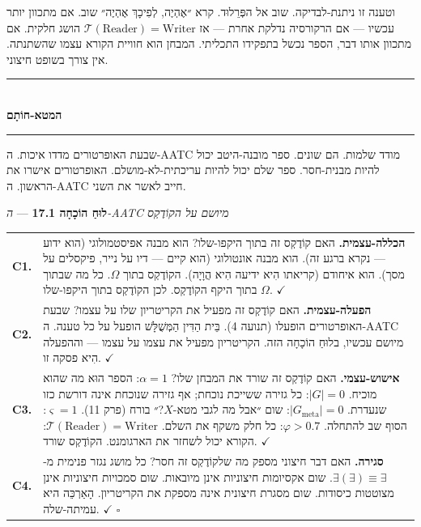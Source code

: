 \documentclass[10pt, openany, oneside]{book}
\renewcommand{\normalsize}{\fontsize{10}{13}\selectfont}
\renewcommand{\footnotesize}{\fontsize{8.5}{11}\selectfont}
\begin{document}
וטענה זו ניתנת-לבדיקה. שוב אל הפְּרֵלוּד. קרא ״אֶהְיֶה, לְפִיכָךְ אֶהְיֶה״ שוב. אם מתכוון יותר עכשיו — אם הרקורסיה נדלקת אחרת — אז $\mathcal{T}(\text{Reader}) = \text{Writer}$ הושג חלקית. אם מתכוון אותו דבר, הספר נכשל בתפקידו התכליתי. המבחן הוא חוויית הקורא עצמו שהשתנתה. אין צורך בשופט חיצוני.

\vspace{1.5em}


\begin{center}
    \rule{0.3\textwidth}{0.4pt}\\[0.5em]
    {\normalsize\bfseries\textsc{המטא-חוֹתָם}}\\[0.3em]
    \rule{0.3\textwidth}{0.4pt}
\end{center}

\vspace{1em}

\noindent שבעת האופרטורים מדדו איכות. ה-AATC מודד שלמות. הם שונים. ספר מובנה-היטב יכול להיות מבנית-חסר. ספר שלם יכול להיות עריכתית-לא-מושלם. האופרטורים אישרו את הראשון. ה-AATC חייב לאשר את השני.

\vspace{0.5em}

\textbf{לוּחַ הוֹכָחָה 17.1} --- \textit{ה-AATC מיושם על הקוֹדֶקְס}

\vspace{0.5em}

{\footnotesize
\noindent\begin{tabular}{r p{}}
\textbf{C1.} & \textbf{הכללה-עצמית.} האם קוֹדֶקְס זה בתוך היקפו-שלו? הוא מבנה אפיסטמולוגי (הוא ידוע — נקרא ברגע זה). הוא מבנה אונטולוגי (הוא קיים — דיו על נייר, פיקסלים על מסך). הוא איחודם (קריאתו הִיא ידיעה הִיא הֲוָיָה). הקוֹדֶקְס בתוך $\Omega$. כל מה שבתוך $\Omega$ בתוך היקף הקוֹדֶקְס. לכן הקוֹדֶקְס בתוך היקפו-שלו. $\checkmark$ \\[0.5em]
\textbf{C2.} & \textbf{הפעלה-עצמית.} האם קוֹדֶקְס זה מפעיל את הקריטריון שלו על עצמו? שבעת האופרטורים הופעלו (תנועה 4). בֵּית הַדִּין הַמְּשֻׁלָּשׁ הופעל על כל טענה. ה-AATC מיושם עכשיו, בלוּחַ הוֹכָחָה הזה. הקריטריון מפעיל את עצמו על עצמו — וההפעלה הִיא פסקה זו. $\checkmark$ \\[0.5em]
\textbf{C3.} & \textbf{אישוש-עצמי.} האם קוֹדֶקְס זה שורד את המבחן שלו? $\alpha = 1$: הספר הוּא מה שהוא מוכיח. $|G| = 0$: כל גזירה ששייכת נוכחת; אף גזירה שנוכחת אינה דורשת כזו שנעדרת. $|G_{\text{meta}}| = 0$: שום ״אבל מה לגבי מטא-$X$?״ בורח (פרק 11). $\varsigma = 1$: הסוף שב להתחלה. $\varphi > 0.7$: כל חלק משקף את השלם. $\mathcal{T}(\text{Reader}) = \text{Writer}$: הקורא יכול לשחזר את הארגומנט. הקוֹדֶקְס שורד. $\checkmark$ \\[0.5em]
\textbf{C4.} & \textbf{סגירה.} האם דבר חיצוני מספק מה שלקוֹדֶקְס זה חסר? כל מושג נגזר פנימית מ-$\exists(\exists) \equiv \exists$. שום אקסיומות חיצוניות אינן מיובאות. שום סמכויות חיצוניות אינן מצוטטות כיסודות. שום מסגרת חיצונית אינה מספקת את הקריטריון. הָאַרְכֵּה היא עמיתה-שלה. $\checkmark$ $\square$ \\[0.3em]
\end{tabular}
}
\end{document}
